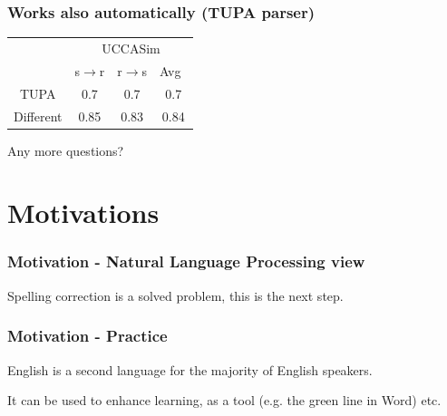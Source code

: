 \documentclass{beamer}
\begin{document}
\begin{frame}
	\frametitle{Works also automatically (TUPA parser)}
	\begin{table}
		\begin{tabular}{c|c|c|c|}
			\cline{2-4} 
			& \multicolumn{3}{c|}{\sc UCCASim} \\
			\cline{2-4}
			& s$\rightarrow$r & r$\rightarrow$s & Avg\
			\\
			\hline
			TUPA & 0.7 & 0.7 & 0.7
			\\
			\hline
			\hline
			Different & 0.85 & 0.83 & 0.84
			\\
			\hline
		\end{tabular}
	\end{table}
\end{frame}

\begin{frame}
	\Huge{\centerline{Any more questions?}}
\end{frame}


\appendix
\section{Motivations}
\begin{frame}
	\frametitle{Motivation - Natural Language Processing view}
		Spelling correction is a solved problem, this is the next step.
\end{frame}

\begin{frame}
	\frametitle{Motivation - Practice}
	English is a second language for the majority of English speakers.
	
	It can be used to enhance learning, as a tool (e.g. the green line in Word) etc.

\end{frame}
\end{document}
